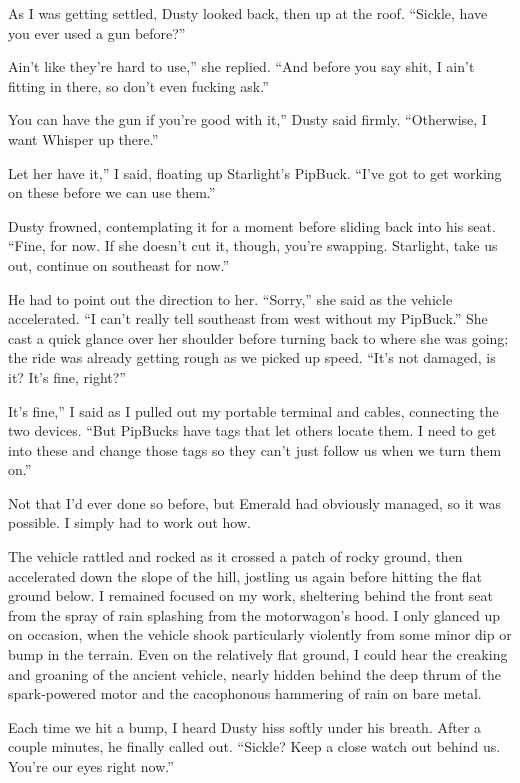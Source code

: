 As I was getting settled, Dusty looked back, then up at the roof. “Sickle, have you ever used a gun before?”

\leavevmode{}Ain’t like they’re hard to use,” she replied. “And before you say shit, I ain’t fitting in there, so don’t even fucking ask.”

\leavevmode{}You can have the gun if you’re good with it,” Dusty said firmly. “Otherwise, I want Whisper up there.”

\leavevmode{}Let her have it,” I said, floating up Starlight’s PipBuck. “I’ve got to get working on these before we can use them.”

Dusty frowned, contemplating it for a moment before sliding back into his seat. “Fine, for now. If she doesn’t cut it, though, you’re swapping. Starlight, take us out, continue on southeast for now.”

He had to point out the direction to her. “Sorry,” she said as the vehicle accelerated. “I can’t really tell southeast from west without my PipBuck.” She cast a quick glance over her shoulder before turning back to where she was going; the ride was already getting rough as we picked up speed. “It’s not damaged, is it? It’s fine, right?”

\leavevmode{}It’s fine,” I said as I pulled out my portable terminal and cables, connecting the two devices. “But PipBucks have tags that let others locate them. I need to get into these and change those tags so they can’t just follow us when we turn them on.”

Not that I’d ever done so before, but Emerald had obviously managed, so it was possible. I simply had to work out how.

The vehicle rattled and rocked as it crossed a patch of rocky ground, then accelerated down the slope of the hill, jostling us again before hitting the flat ground below. I remained focused on my work, sheltering behind the front seat from the spray of rain splashing from the motorwagon’s hood. I only glanced up on occasion, when the vehicle shook particularly violently from some minor dip or bump in the terrain. Even on the relatively flat ground, I could hear the creaking and groaning of the ancient vehicle, nearly hidden behind the deep thrum of the spark-powered motor and the cacophonous hammering of rain on bare metal.

Each time we hit a bump, I heard Dusty hiss softly under his breath. After a couple minutes, he finally called out. “Sickle? Keep a close watch out behind us. You’re our eyes right now.”

